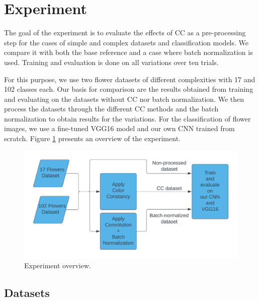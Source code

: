 

\section{Experiment}

The goal of the experiment is to evaluate the effects of \gls{CC} as a pre-processing step for the cases
of simple and complex datasets and classification models. We compare it with both the base reference and a case where batch normalization is used.
Training and evaluation is done on all variations over ten trials.

For this purpose, we use two flower datasets of different complexities with 17 and 102 classes each. Our basis for comparison
are the results obtained from training and evaluating on the datasets without \gls{CC} nor batch normalization.
We then process the datasets through the different \gls{CC} methods and the batch normalization to obtain results
for the variations. For the classification of flower images, we use a fine-tuned VGG16 model and our own \gls{CNN} trained from scratch.
Figure \ref{fig:experiment_pipeline} presents an overview of the experiment.

\begin{figure}[ht]
    \centering
    \includegraphics[width=\textwidth]{images/experiment_pipeline.png}
    \caption{Experiment overview.}
    \label{fig:experiment_pipeline}
\end{figure}

\subsection{Datasets}

